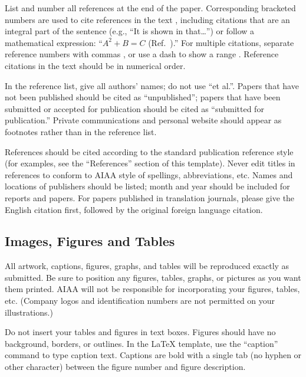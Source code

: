 \documentclass[conf]{new-aiaa}
\begin{document}
    List and number all references at the end of the paper. Corresponding bracketed numbers are used to cite references in the text \cite{vatistas1986reverse}, including citations that are an integral part of the sentence (e.g., ``It is shown in \cite{dornheim1996planetary} that\ldots '') or follow a mathematical expression: ``$A^{2} + B = C$ (Ref.~\cite{terster1997nasa}).'' For multiple citations, separate reference numbers with commas \cite{peyret2012computational,oates1997aerothermodynamics}, or use a dash to show a range \cite{volpe1994techniques,thompsonspacecraft,chi1993fluid,brandis2016nonequi}. Reference citations in the text should be in numerical order.
    
    In the reference list, give all authors' names; do not use ``et al.''. Papers that have not been published should be cited as ``unpublished''; papers that have been submitted or accepted for publication should be cited as ``submitted for publication.'' Private communications and personal website should appear as footnotes rather than in the reference list.
    
    References should be cited according to the standard publication reference style (for examples, see the ``References'' section of this template). Never edit titles in references to conform to AIAA style of spellings, abbreviations, etc. Names and locations of publishers should be listed; month and year should be included for reports and papers. For papers published in translation journals, please give the English citation first, followed by the original foreign language citation.
    
    \subsection{Images, Figures and Tables}
    
    All artwork, captions, figures, graphs, and tables will be reproduced exactly as submitted. Be sure to position any figures, tables, graphs, or pictures as you want them printed. AIAA will not be responsible for incorporating your figures, tables, etc. (Company logos and identification numbers are not permitted on your illustrations.)
    
    Do not insert your tables and figures in text boxes. Figures should have no background, borders, or outlines. In the \LaTeX{} template, use the ``caption'' command to type caption text. Captions are bold with a single tab (no hyphen or other character) between the figure number and figure description.
\end{document}
